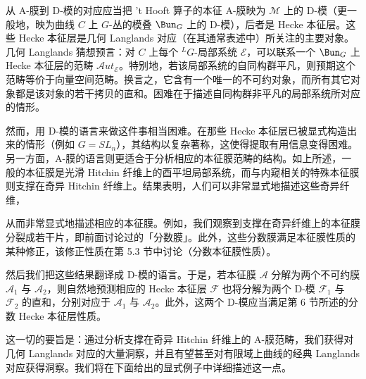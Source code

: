 从 A-膜到 D-模的对应应当把 't Hooft 算子的本征 A-膜映为 $\mathcal{M}$ 上的 D-模（更一般地，映为曲线 $C$ 上 $G$-丛的模叠 $\Bun_G$ 上的 D-模），后者是 Hecke 本征层。这些 Hecke 本征层是几何 Langlands 对应（在其通常表述中）所关注的主要对象。几何 Langlands 猜想预言：对 $C$ 上每个 ${}^{L}G$-局部系统 $\mathcal{E}$，可以联系一个 $\Bun_G$ 上 Hecke 本征层的范畴 $\mathcal{A}ut_\mathcal{E}$。特别地，若该局部系统的自同构群平凡，则预期这个范畴等价于向量空间范畴。换言之，它含有一个唯一的不可约对象，而所有其它对象都是该对象的若干拷贝的直和。困难在于描述自同构群非平凡的局部系统所对应的情形。

然而，用 D-模的语言来做这件事相当困难。在那些 Hecke 本征层已被显式构造出来的情形（例如 $G=SL_n$），其结构以复杂著称，这使得提取有用信息变得困难。另一方面，A-膜的语言则更适合于分析相应的本征膜范畴的结构。如上所述，一般的本征膜是光滑 Hitchin 纤维上的酉平坦局部系统，而与内窥相关的特殊本征膜则支撑在奇异 Hitchin 纤维上。结果表明，人们可以非常显式地描述这些奇异纤维，


从而非常显式地描述相应的本征膜。例如，我们观察到支撑在奇异纤维上的本征膜分裂成若干片，即前面讨论过的「分数膜」。此外，这些分数膜满足本征膜性质的某种修正，该修正性质在第 5.3 节中讨论（分数本征膜性质）。

然后我们把这些结果翻译成 D-模的语言。于是，若本征膜 $\mathcal{A}$ 分解为两个不可约膜 $\mathcal{A}_1$ 与 $\mathcal{A}_2$，则自然地预测相应的 Hecke 本征层 $\mathcal{F}$ 也将分解为两个 D-模 $\mathcal{F}_1$ 与 $\mathcal{F}_2$ 的直和，分别对应于 $\mathcal{A}_1$ 与 $\mathcal{A}_2$。此外，这两个 D-模应当满足第 6 节所述的分数 Hecke 本征层性质。

这一切的要旨是：通过分析支撑在奇异 Hitchin 纤维上的 A-膜范畴，我们获得对几何 Langlands 对应的大量洞察，并且有望甚至对有限域上曲线的经典 Langlands 对应获得洞察。我们将在下面给出的显式例子中详细描述这一点。
